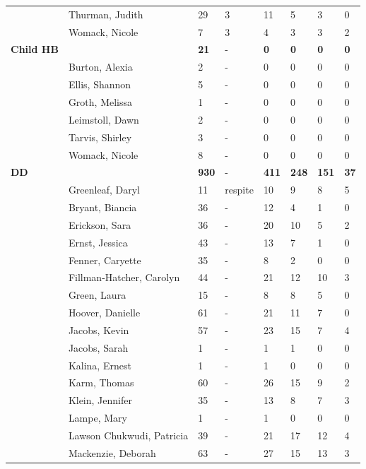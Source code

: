 \documentclass{article}\usepackage[]{graphicx}\usepackage[]{color}
\begin{document}
{\begin{longtable} { >{\raggedright}p{}p{}p{}p{}p{}p{}p{}p{}}
   & Thurman, Judith & 29 & 3 & 11 & 5 & 3 & 0 \\ 
   & Womack, Nicole & 7 & 3 & 4 & 3 & 3 & 2 \\ 
   \hline
\textbf{Child HB} &  & \textbf{21} & - & \textbf{0} & \textbf{0} & \textbf{0} & \textbf{0} \\ 
   \rowcolor[gray]{0.90} & Burton, Alexia & 2 & - & 0 & 0 & 0 & 0 \\ 
   \rowcolor[gray]{0.90} & Ellis, Shannon & 5 & - & 0 & 0 & 0 & 0 \\ 
   & Groth, Melissa & 1 & - & 0 & 0 & 0 & 0 \\ 
   & Leimstoll, Dawn & 2 & - & 0 & 0 & 0 & 0 \\ 
   & Tarvis, Shirley & 3 & - & 0 & 0 & 0 & 0 \\ 
   \rowcolor[gray]{0.90} & Womack, Nicole & 8 & - & 0 & 0 & 0 & 0 \\ 
   \hline
\textbf{DD} &  & \textbf{930} & - & \textbf{411} & \textbf{248} & \textbf{151} & \textbf{37} \\ 
   \rowcolor[gray]{0.90} & Greenleaf, Daryl & 11 & respite & 10 & 9 & 8 & 5 \\ 
   & Bryant, Biancia & 36 & - & 12 & 4 & 1 & 0 \\ 
   & Erickson, Sara & 36 & - & 20 & 10 & 5 & 2 \\ 
   & Ernst, Jessica & 43 & - & 13 & 7 & 1 & 0 \\ 
   \rowcolor[gray]{0.90} & Fenner, Caryette & 35 & - & 8 & 2 & 0 & 0 \\ 
   \rowcolor[gray]{0.90} & Fillman-Hatcher, Carolyn & 44 & - & 21 & 12 & 10 & 3 \\ 
   \rowcolor[gray]{0.90} & Green, Laura & 15 & - & 8 & 8 & 5 & 0 \\ 
   & Hoover, Danielle & 61 & - & 21 & 11 & 7 & 0 \\ 
   & Jacobs, Kevin & 57 & - & 23 & 15 & 7 & 4 \\ 
   & Jacobs, Sarah & 1 & - & 1 & 1 & 0 & 0 \\ 
   \rowcolor[gray]{0.90} & Kalina, Ernest & 1 & - & 1 & 0 & 0 & 0 \\ 
   \rowcolor[gray]{0.90} & Karm, Thomas & 60 & - & 26 & 15 & 9 & 2 \\ 
   \rowcolor[gray]{0.90} & Klein, Jennifer & 35 & - & 13 & 8 & 7 & 3 \\ 
   & Lampe, Mary & 1 & - & 1 & 0 & 0 & 0 \\ 
   & Lawson Chukwudi, Patricia & 39 & - & 21 & 17 & 12 & 4 \\ 
   & Mackenzie, Deborah & 63 & - & 27 & 15 & 13 & 3 \\ 

\end{longtable}}
\end{document}
